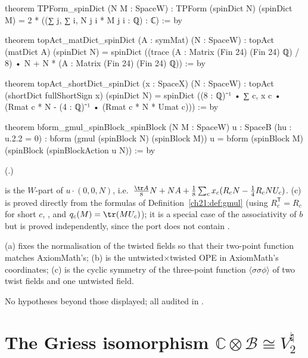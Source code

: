 \begin{leancode}
theorem TPForm_spinDict (N M : SpaceW) :
    TPForm (spinDict N) (spinDict M) = 2 * ((∑ j, ∑ i, N j i * M j i : ℚ) : ℂ) := by
\end{leancode}
\begin{leancode}
theorem topAct_matDict_spinDict (A : symMat) (N : SpaceW) :
    topAct (matDict A) (spinDict N)
      = spinDict ((trace (A : Matrix (Fin 24) (Fin 24) ℚ) / 8) • N + N * (A : Matrix (Fin 24) (Fin 24) ℚ)) := by
\end{leancode}
\begin{leancode}
theorem topAct_shortDict_spinDict (x : SpaceX) (N : SpaceW) :
    topAct (shortDict fullShortSign x) (spinDict N)
      = spinDict ((8 : ℚ)⁻¹ • ∑ c, x c • (Rmat c * N - (4 : ℚ)⁻¹ • (Rmat c * N * Umat c))) := by
\end{leancode}
\begin{leancode}
theorem bform_gmul_spinBlock_spinBlock (N M : SpaceW) {u : SpaceB} (hu : u.2.2 = 0) :
    bform (gmul (spinBlock N) (spinBlock M)) u
      = bform (spinBlock M) (spinBlock (spinBlockAction u N)) := by
\end{leancode}
(.)
\begin{dictionary}
 is the $W$-part of $u\cdot(0,0,N)$, i.e.\
$\tfrac{\tr A}8N+NA+\tfrac18\sum_cx_c(R_cN-\tfrac14R_cNU_c)$.  (c) is proved directly from the formulas
of Definition~\ref{ch21:def:gmul} (using $R_c^{\mathsf T}=R_c$ for short $c$, ,
and $q_c(M)=\tr(MU_c)$); it is a special case of the associativity of $b$ but is proved independently, since
the port does not contain \lean{bform_gmul_assoc}.
\end{dictionary}
\begin{physics}
(a) fixes the normalisation of the twisted fields so that their two-point function matches
AxiomMath's; (b) is the untwisted$\times$twisted OPE in AxiomMath's coordinates; (c) is the
cyclic symmetry of the three-point function $\langle\sigma\sigma\phi\rangle$ of two twist fields and one
untwisted field.
\end{physics}
\begin{status}
No hypotheses beyond those displayed; all audited in .
\end{status}

\section{The Griess isomorphism \texorpdfstring{$\mathbb C\otimes\mathcal B\cong V^\natural_2$}{C (x) B = V-natural\_2}}\label{ch21:sec:iso}

